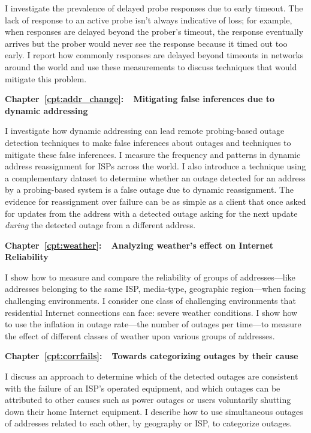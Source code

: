I investigate the
prevalence of delayed probe responses due to early timeout. The lack
of response to an active probe isn't always indicative of loss; for
example, when responses are delayed beyond the prober's timeout, the
response eventually arrives but the prober would never see the
response because it timed out too early. I report how commonly
responses are delayed beyond timeouts in networks around the world and
use these measurements to discuss techniques that would mitigate this problem.

\textbf{Chapter~\ref{cpt:addr_change}:~~Mitigating false inferences due to dynamic addressing} 

I investigate how dynamic addressing can lead remote probing-based
outage detection techniques to make false inferences about outages and
techniques to mitigate these false inferences. I measure the frequency
and patterns in dynamic address reassignment for ISPs across the
world.  I also introduce a technique using a complementary dataset to
determine whether an outage detected for an address by a probing-based
system is a false outage due to dynamic reassignment. The evidence for
reassignment over failure can be as simple as a client that once asked
for updates from the address with a detected outage asking for the
next update \emph{during} the detected outage from a different address.

\textbf{Chapter~\ref{cpt:weather}:~~Analyzing weather's effect on
  Internet Reliability} 

I show how to measure and compare the reliability of groups of addresses---like
addresses belonging to the same ISP, media-type, geographic
region---when facing challenging environments. I consider one class of
challenging environments that residential Internet connections can
face: severe weather conditions. I show how to use the inflation in
outage rate---the number of outages per time---to measure the effect
of different classes of weather upon various groups of addresses.

\textbf{Chapter~\ref{cpt:corrfails}:~~Towards categorizing outages by
  their cause} 

I discuss an approach to determine which of the detected outages are
consistent with the failure of an ISP's operated equipment, and which
outages can be attributed to other causes such as power outages or
users voluntarily shutting down their home Internet equipment. I
describe how to use simultaneous outages of addresses related
to each other, by geography or ISP, to categorize outages.

